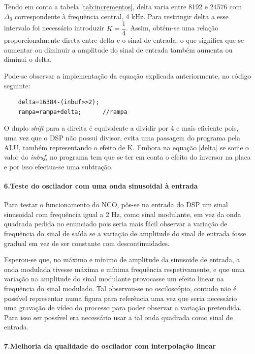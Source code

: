 \documentclass[11pt]{article}
\numberwithin{equation}{section}
\begin{document}
	Tendo em conta a tabela \ref{tab:incrementos}, delta varia entre 8192 e 24576 com $\Delta_0$ correspondente à frequência central, 4 kHz. Para restringir delta a esse intervalo foi necessário introduzir $K=\dfrac{1}{4}$. Assim, obtém-se uma relação proporcionalmente direta entre delta e o sinal de entrada, o que significa que se aumentar ou diminuir a amplitude do sinal de entrada também aumenta ou diminui o delta.
	
	Pode-se observar a implementação da equação explicada anteriormente, no código seguinte:
	\begin{lstlisting}
	delta=16384-(inbuf>>2); 
	rampa=rampa+delta;		//rampa
	\end{lstlisting}
	
	O duplo \textit{shift} para a direita é equivalente a dividir por 4 e mais eficiente pois, uma vez que o DSP não possui divisor, evita uma passagem do programa pela ALU, também representando o efeito de K.
	Embora na equação \ref{delta} se some o valor do \textit{inbuf}, no programa tem que se ter em conta o efeito do inversor na placa e por isso efectua-se uma subtração.
	\paragraph{6.Teste do oscilador com uma onda sinusoidal à entrada} \label{para:P1-6} \hspace{0pt}
	
	Para testar o funcionamento do NCO, pôs-se na entrada do DSP um sinal sinusoidal com frequência igual a 2 Hz, como sinal modulante, em vez da onda quadrada pedida no enunciado pois seria mais fácil observar a variação de frequência do sinal de saída se a variação de amplitude do sinal de entrada fosse gradual em vez de ser constante com descontinuidades. 
	\vspace{1 mm}
	
	Esperou-se que, no máximo e mínimo de amplitude da sinusoide de entrada, a onda modulada tivesse máxima e mínima frequência respetivamente, e que uma variação na amplitude do sinal modulante provocasse um efeito linear na frequência do sinal modulado. Tal observou-se no osciloscópio, contudo não é possível representar numa figura para referência uma vez que seria necessário uma gravação de vídeo do processo para poder observar a variação pretendida. Para isso ser possível era necessário usar a tal onda quadrada como sinal de entrada.
	
	\paragraph{7.Melhoria da qualidade do oscilador com interpolação linear} \hspace{0pt} \label{para:P1-7}
	
\end{document}
